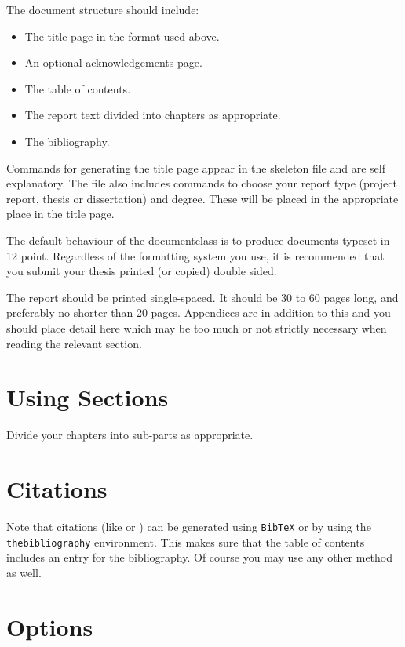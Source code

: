 \documentclass[bsc,frontabs,singlespacing,parskip,deptreport]{infthesis}     %
\begin{document}
The document structure should include:
\begin{itemize}
\item
The title page  in the format used above.
\item
An optional acknowledgements page.
\item
The table of contents.
\item
The report text divided into chapters as appropriate.
\item
The bibliography.
\end{itemize}

Commands for generating the title page appear in the skeleton file and
are self explanatory.
The file also includes commands to choose your report type (project
report, thesis or dissertation) and degree.
These will be placed in the appropriate place in the title page. 

The default behaviour of the documentclass is to produce documents typeset in
12 point.  Regardless of the formatting system you use, 
it is recommended that you submit your thesis printed (or copied) 
double sided.

The report should be printed single-spaced.
It should be 30 to 60 pages long, and preferably no shorter than 20 pages.
Appendices are in addition to this and you should place detail
here which may be too much or not strictly necessary when reading the relevant section.

\section{Using Sections}

Divide your chapters into sub-parts as appropriate.

\section{Citations}

Note that citations 
(like \cite{P1} or \cite{P2})
can be generated using {\tt BibTeX} or by using the
{\tt thebibliography} environment. This makes sure that the
table of contents includes an entry for the bibliography.
Of course you may use any other method as well.

\section{Options}
\end{document}
